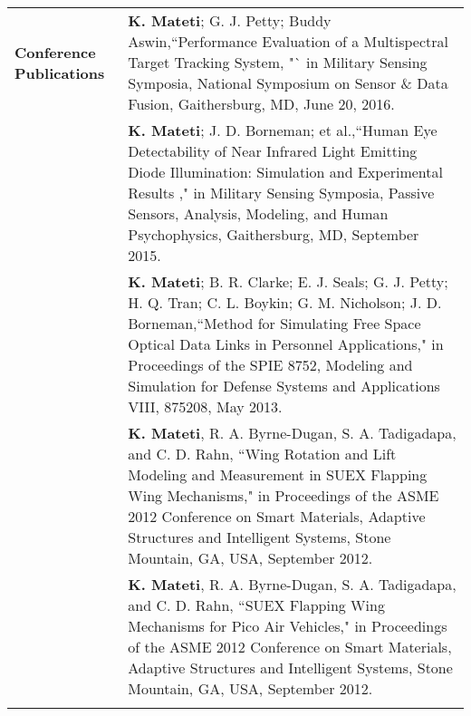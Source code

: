 \documentclass{article}[16pt]
\newlength{\lcolw}
\newlength{\rcolw}
\newlength{\hlcolw}
\begin{document}
\begin{tabular}{L{\hlcolw}  L{\rcolw}}
\textbf{\Large Conference Publications} 
&	\textbf{K. Mateti}; G. J. Petty; Buddy Aswin,``Performance Evaluation of a Multispectral Target Tracking System, "` in Military Sensing Symposia, National Symposium on Sensor \& Data Fusion, Gaithersburg, MD, June 20, 2016.
\vspace{0.1in} \\ 
&	\textbf{K. Mateti}; J. D. Borneman; et al.,``Human Eye Detectability of Near Infrared Light Emitting Diode Illumination: Simulation and Experimental Results ," in Military Sensing Symposia, Passive Sensors, Analysis, Modeling, and Human Psychophysics, Gaithersburg, MD, September 2015.
\vspace{0.1in} \\ 
&	\textbf{K. Mateti}; B. R. Clarke; E. J. Seals; G. J. Petty; H. Q. Tran; C. L. Boykin; G. M. Nicholson; J. D. Borneman,``Method for Simulating Free Space Optical Data Links in Personnel Applications," in Proceedings of the SPIE 8752, Modeling and Simulation for Defense Systems and Applications VIII, 875208, May 2013.
\vspace{0.1in} \\ 
&	\textbf{K. Mateti}, R. A. Byrne-Dugan, S. A. Tadigadapa, and C. D. Rahn, ``Wing Rotation and Lift Modeling and Measurement in SUEX Flapping Wing Mechanisms," in Proceedings of the ASME 2012 Conference on Smart Materials, Adaptive Structures and Intelligent Systems, Stone Mountain, GA, USA, September 2012.
\vspace{0.1in} \\ 
&	\textbf{K. Mateti}, R. A. Byrne-Dugan, S. A. Tadigadapa, and C. D. Rahn, ``SUEX Flapping Wing Mechanisms for Pico Air Vehicles," in Proceedings of the ASME 2012 Conference on Smart Materials, Adaptive Structures and Intelligent Systems, Stone Mountain, GA, USA, September 2012.
\vspace{0.1in} \\ 
\hline \\
\end{tabular}
\end{document}
